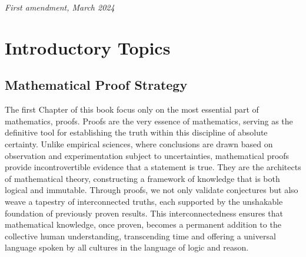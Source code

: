 \documentclass[
	12pt, %
	fleqn, %
	a4paper, %
]{LegrandOrangeBook}
\begin{document}
\noindent \textit{First amendment, March 2024} %


\pagestyle{empty} %

\tableofcontents %

\listoffigures %

\listoftables %

\pagestyle{fancy} %

\cleardoublepage %


\part{Introductory Topics}


\chapterspaceabove{4.25cm} %
\chapterspacebelow{7.25cm} %


\chapter{Mathematical Proof Strategy}
The first Chapter of this book focus only on the most essential part of mathematics, proofs. Proofs are the very essence of mathematics, 
serving as the definitive tool for establishing the truth within this discipline of absolute certainty. Unlike empirical sciences, where conclusions are 
drawn based on observation and experimentation subject to uncertainties, mathematical proofs provide incontrovertible evidence that a statement is true. 
They are the architects of mathematical theory, constructing a framework of knowledge that is both logical and immutable. Through proofs, we not 
only validate conjectures but also weave a tapestry of interconnected truths, each supported by the unshakable foundation of previously proven results. 
This interconnectedness ensures that mathematical knowledge, once proven, becomes a permanent addition to the collective human understanding, transcending time 
and offering a universal language spoken by all cultures in the language of logic and reason.
\end{document}

